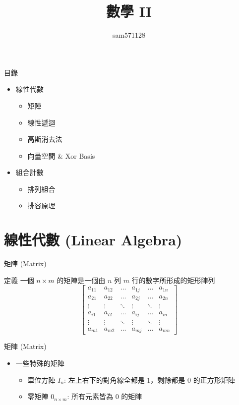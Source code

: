 \documentclass[aspectratio=169]{beamer}
\title{數學 II}
\author{sam571128}
\date[附中延平競程讀書會]
\begin{document}
    \begin{frame}
        \titlepage
    \end{frame}
    
    \begin{frame}{目錄}
        \begin{itemize}
            \item 線性代數
            \begin{itemize}
                \item 矩陣
                \item 線性遞迴
                \item 高斯消去法
                \item 向量空間 \& Xor Basis
            \end{itemize}
            \item 組合計數
            \begin{itemize}
                \item 排列組合
                \item 排容原理
            \end{itemize}
        \end{itemize}
    \end{frame}
    
    \section{線性代數 (Linear Algebra)}
    
    \begin{frame}{矩陣 (Matrix)}
        \begin{block}{定義}
            一個 $n \times m$ 的矩陣是一個由 $n$ 列 $m$ 行的數字所形成的矩形陣列
            $$\displaystyle {\begin{bmatrix}a_{11}&a_{12}&\dots &a_{1j}&\dots &a_{1n}\\a_{21}&a_{22}&\dots &a_{2j}&\dots &a_{2n}\\ \vdots &\vdots &\ddots &\vdots &\ddots &\vdots \\a_{i1}&a_{i2}&\dots &a_{ij}&\dots &a_{in}\\\vdots &\vdots  &\ddots &\vdots &\ddots &\vdots \\a_{m1}&a_{m2}&\dots &a_{mj}&\dots &a_{mn}\end{bmatrix}}$$
        \end{block}
    \end{frame}
    
    \begin{frame}{矩陣 (Matrix)}
        \begin{itemize}
            \item 一些特殊的矩陣
            \begin{itemize}
                \item 單位方陣 $I_n$: 左上右下的對角線全都是 $1$，剩餘都是 $0$ 的正方形矩陣
                \item 零矩陣 $0_{n \times m}$: 所有元素皆為 $0$ 的矩陣
            \end{itemize}
        \end{itemize}
    \end{frame}
    
\end{document}

